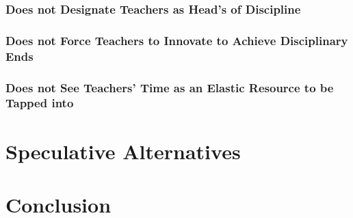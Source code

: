 \documentclass[12pt]{article}
\begin{document}
	\subsubsection{Does not Designate Teachers as Head's of Discipline}
	\subsubsection{Does not Force Teachers to Innovate to Achieve Disciplinary Ends}
	\subsubsection{Does not See Teachers' Time as an Elastic Resource to be Tapped into}
	
	\section{Speculative Alternatives}
	
	\section{Conclusion}
	
	\pagebreak
	
\end{document}
